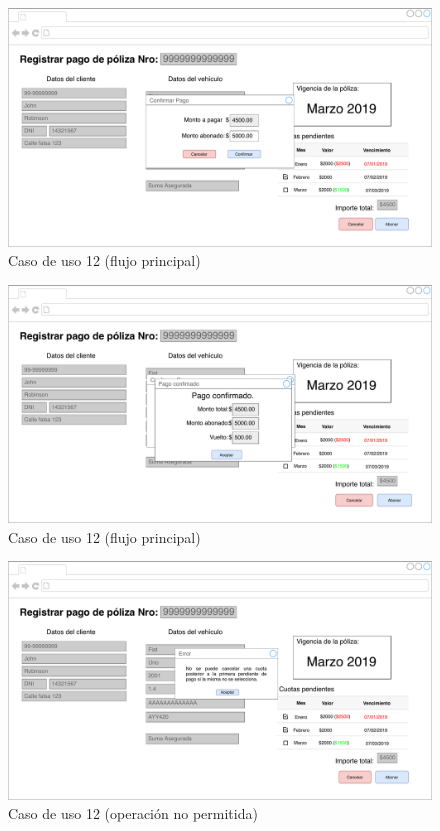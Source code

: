 \documentclass[12pt]{article}
\begin{document}
\vfill
\begin{figure}[h!]
\includegraphics[width=\textwidth]{CU12/CU-122.pdf}
\caption{Caso de uso 12 (flujo principal)}
\end{figure}
\vfill

\vfill
\begin{figure}[h!]
\includegraphics[width=\textwidth]{CU12/CU-123.pdf}
\caption{Caso de uso 12 (flujo principal)}
\end{figure}
\vfill

\vfill
\begin{figure}[h!]
\includegraphics[width=\textwidth]{CU12/CU-124.pdf}
\caption{Caso de uso 12 (operación no permitida)}
\end{figure}
\vfill
\end{document}
